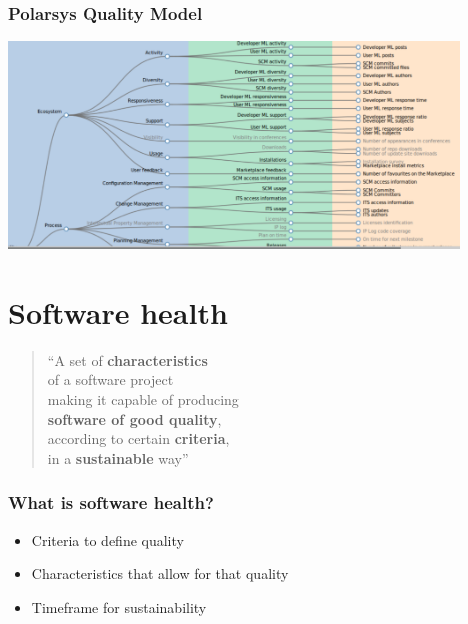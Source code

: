 \documentclass[17pt,aspectratio=169,hyperref=pdfusetitle]{beamer}
\begin{document}
\begin{frame}[fragile]
  \frametitle{Polarsys Quality Model}

  \begin{center}
  \includegraphics[height=5.5cm]{figs/polarsys-all}
  \end{center}  
  
\end{frame}

\section{Software health}

\begin{frame}[fragile]

  {\em
    \begin{quote}
      ``A set of \textbf{characteristics} \\
      of a software project \\
      making it capable of producing \\
      \textbf{software of good quality}, \\
      according to certain \textbf{criteria}, \\
      in a \textbf{sustainable} way'' \\
  \end{quote}
  }
  
\end{frame}

\begin{frame}[fragile]
  \frametitle{What is software health?}

  \begin{itemize}
  \item Criteria to define quality
  \item Characteristics that allow for that quality
  \item Timeframe for sustainability
  \end{itemize}
\end{frame}
\end{document}
